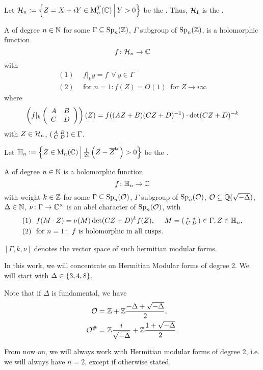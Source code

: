 Let $\SiegelHalfPlane_n := \Set{Z = X + iY \in \M_n^T(\C)}{Y > 0}$ be the .
Thus, $\mathcal{H}_1$ is the .


A  of degree $n\in\mathbb{N}$ for some $\Gamma \subseteq \operatorname{Sp}_n(\mathbb{Z})$, $\Gamma$ subgroup of $\operatorname{Sp}_n(\mathbb{Z})$, is a holomorphic function
\[ f \colon \mathcal{H}_n \rightarrow \mathbb{C} \]
with
\begin{align*}
(1) \ \ & f |_k y = f \ \ \forall \ y \in \Gamma \\
(2) \ \ & \text{for } n = 1 \colon f(Z) = O(1) \ \text{ for } Z \rightarrow i \infty
\end{align*}
where
\[ \left( f|_k \left( \begin{array}{cc} A & B \\ C & D \end{array} \right) \right) (Z) =
f((AZ + B)(CZ + D)^{-1}) \cdot \det(CZ + D)^{-k} \]
with $Z \in \mathcal{H}_n$, $\left( \begin{smallmatrix} A & B \\ C & D \end{smallmatrix} \right) \in \Gamma$.

Let $\HalfPlane_n :=  \Set{ Z \in \M_n(\C) }{ \frac{1}{2 i} \left(Z - \overline{Z}^\tr \right) > 0}$ be the .

A  of degree $n\in\mathbb{N}$
is a holomorphic function
\[ f \colon \mathbb{H}_n \rightarrow \mathbb{C} \]
with weight $k\in \mathbb{Z}$ for some $\Gamma \subseteq \operatorname{Sp}_n(\mathcal{O})$, $\Gamma$ subgroup of $\operatorname{Sp}_n(\mathcal{O})$, $\mathcal{O} \subseteq \mathbb{Q}(\sqrt{-\Delta})$, $\Delta \in \mathbb{N}$, $\nu \colon \Gamma \rightarrow \mathbb{C}^\times$ is an abel character of $\operatorname{Sp}_n(\mathcal{O})$, with
\begin{align*}
(1) \ \ & f(M \cdot Z) = \nu(M) \det(CZ + D)^k f(Z), \ \ \ \ M = \left( \begin{smallmatrix} * & * \\ C & D \end{smallmatrix} \right) \in \Gamma, Z \in \mathbb{H}_n , \\
(2) \ \ & \text{for } n = 1 \colon \ \text{$f$ is holomorphic in all cusps} .
\end{align*}

$[\Gamma, k, \nu]$ denotes the vector space of such hermitian modular forms.

In this work, we will concentrate on Hermitian Modular forms of degree 2. We will start with $\Delta \in \Set{3,4,8}$.

Note that if $\Delta$ is fundamental, we have
\begin{align*}
\mathcal{O} = &\ \mathbb{Z} +  \mathbb{Z} \frac{-\Delta+\sqrt{-\Delta}}{2} , \\
\mathcal{O}^\# = & \ \mathbb{Z} \frac{i}{\sqrt{-\Delta}} + \mathbb{Z} \frac{1 + \sqrt{-\Delta}}{2} .
\end{align*}

From now on, we will always work with Hermitian modular forms of degree 2, i.e. we will always have $n=2$, except if otherwise stated.

